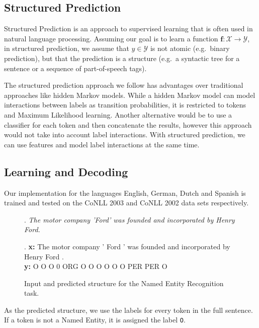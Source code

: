 \documentclass[11pt]{article}
\newcommand{\namedentity}{Named Entity}
\newcommand{\Oo}{\texttt O}
\begin{document}
\subsection{Structured Prediction}
Structured Prediction \cite{Taskar:2005:LSP:1102351.1102464} is an approach to supervised learning that is often used in natural language processing. Assuming our goal is to learn a function ${ \boldsymbol{f}\colon \mathcal{X}\to\mathcal{Y} }$, in structured prediction, we assume that $y \in \mathcal{Y}$ is not atomic (e.g.\ binary prediction), but that the prediction is a structure (e.g.\ a syntactic tree for a sentence or a sequence of part-of-speech tags). 

The structured prediction approach we follow has advantages over traditional approaches like hidden Markov models. While a hidden Markov model can model interactions between labels as transition probabilities, it is restricted to tokens and Maximum Likelihood learning. Another alternative would be to use a classifier for each token and then concatenate the results, however this approach would not take into account label interactions. With structured prediction, we can use features and model label interactions at the same time.

\subsection{Learning and Decoding}

Our implementation for the languages English, German, Dutch and Spanish is trained and tested on the CoNLL 2003 and CoNLL 2002 data sets respectively. 


\begin{figure}[ht]

\ex. \emph{The motor company 'Ford' was founded and incorporated  by Henry Ford.} \label{PredEx1a}
 
\exg. \textbf{x:} The motor company ' Ford ' was founded and incorporated by Henry Ford .\\
      \textbf{y:}  O   O      O     0 ORG  O  O     O     O       O        O PER   PER  O  \label{PredEx1b} \\
\caption{Input and predicted structure for the Named Entity Recognition task.}

\end{figure}


As the predicted structure, we use the labels for every token in the full sentence. If a token is not a \namedentity, it is assigned the label \Oo.
\end{document}
